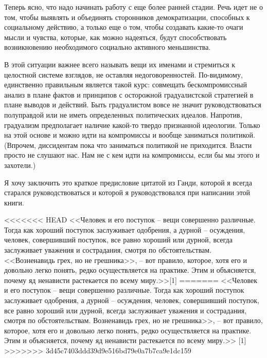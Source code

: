 \documentclass{book}
\begin{document}
Теперь ясно, что надо начинать работу с еще более ранней стадии. Речь идет не о том, чтобы выявлять и объединять сторонников 
демократизации, способных к социальному действию, а только еще о том, чтобы создавать какие-то очаги мысли и чувства, которые, 
как можно надеяться, будут способствовать возникновению необходимого социально активного меньшинства.

В этой ситуации важнее всего называть вещи их именами и стремиться к целостной системе взглядов, не оставляя недоговоренностей. 
По-видимому, единственно правильным является такой курс: совмещать бескомпромиссный анализ в плане фактов и принципов с 
осторожной градуалистской стратегией в плане выводов и действий. Быть градуалистом вовсе не значит руководствоваться полуправдой 
или не иметь определенных политических идеалов. Напротив, градуализм предполагает наличие какой-то твердо признанной идеологии. 
Только на этой основе и можно идти на компромиссы и вообще заниматься политикой. (Впрочем, диссидентам пока что заниматься 
политикой не приходится. Власти просто не слушают нас. Нам не с кем идти на компромиссы, если бы мы этого и захотели.)

Я хочу заключить это краткое предисловие цитатой из Ганди, которой я всегда старался руководствоваться и которой я 
руководствовался при написании этой книги.

<<<<<<< HEAD
<<Человек и его поступок -- вещи совершенно различные. Тогда как хороший поступок заслуживает одобрения, а дурной -- осуждения, человек, совершивший поступок, все равно хороший или дурной, всегда заслуживает уважения и сострадания, смотря по обстоятельствам. <<Возненавидь грех, но не грешника>>, -- вот правило, которое, хотя его и довольно легко понять, редко осуществляется на практике. Этим и объясняется, почему яд ненависти растекается по всему миру.>>[1]
=======
<<Человек и его поступок -- вещи совершенно различные. Тогда как хороший поступок заслуживает одобрения, а дурной -- осуждения, 
человек, совершивший поступок, все равно хороший или дурной, всегда заслуживает уважения и сострадания, смотря по 
обстоятельствам. Возненавидь грех, но не грешника>>, -- вот правило, которое, хотя его и довольно легко понять, редко 
осуществляется на практике. Этим и объясняется, почему яд ненависти растекается по всему миру.>> [1]
>>>>>>> 3d45c7403ddd39d9e516bd79e0a7b7ca9e1dc159



\newpage
\thispagestyle{empty}
\end{document}
